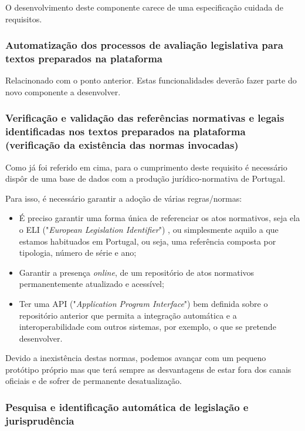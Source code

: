 O desenvolvimento deste componente carece de uma especificação cuidada de requisitos.

\subsubsection{Automatização dos processos de avaliação legislativa para textos preparados na plataforma}

Relacinonado com o ponto anterior. Estas funcionalidades deverão fazer parte do novo componente a desenvolver.

\subsubsection{Verificação e validação das referências normativas e legais identificadas nos textos preparados
na plataforma (verificação da existência das normas invocadas)}

Como já foi referido em cima, para o cumprimento deste requisito é necessário dispôr de uma base de dados com a 
produção jurídico-normativa de Portugal.

Para isso, é necessário garantir a adoção de várias regras/normas:

\begin{itemize}
    \item É preciso garantir uma forma única de referenciar os atos normativos, seja ela o ELI 
    ("\emph{European Legislation Identifier}") \cite{ELI}, ou simplesmente aquilo a que estamos habituados em Portugal, ou 
    seja, uma referência composta por tipologia, número de série e ano; 

    \item Garantir a presença \emph{online}, de um repositório de atos normativos permanentemente atualizado e acessível;
    \item Ter uma API ("\emph{Application Program Interface}") bem definida sobre o repositório anterior que permita a 
    integração automática e a interoperabilidade com outros sistemas, por exemplo, o que se pretende desenvolver.
\end{itemize}

Devido a inexistência destas normas, podemos avançar com um pequeno protótipo próprio mas que terá sempre as desvantagens de 
estar fora dos canais oficiais e de sofrer de permanente desatualização.


\subsubsection{Pesquisa e identificação automática de legislação e jurisprudência}

